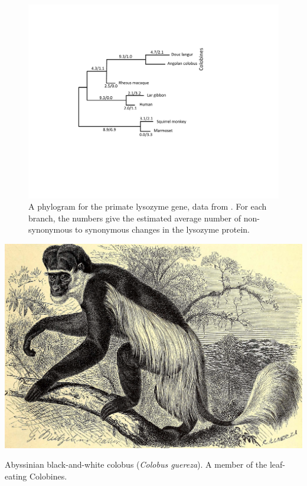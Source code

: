 \begin{figure}
\begin{center}
\includegraphics[width=0.8 \textwidth]{Journal_figs/genetic_drift/Yang_lysozyme/Yang_lysozyme.pdf}
\end{center}
\caption{A phylogram for the primate lysozyme gene, data from
  \citet{Yang:98}. For each branch, the numbers give the estimated average
number of non-synonymous to synonymous changes in the lysozyme protein.} \label{fig:lysozyme}  
\end{figure} 

\begin{marginfigure}
\begin{center}
\includegraphics[width=0.8 \textwidth]{illustration_images/Genetic_drift/Colobus/19792029373_fcce706e67_k.jpg}
\end{center}
\caption{Abyssinian black-and-white colobus ({\it Colobus guereza}). A member of the leaf-eating Colobines. } \label{fig:Colobus}  
\end{marginfigure} 

